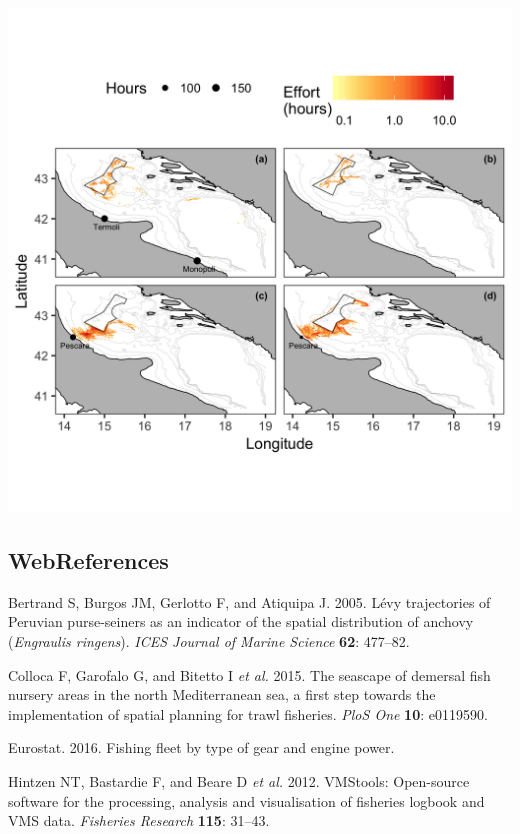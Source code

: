 \documentclass[11pt,]{article}
\begin{document}
\includegraphics[width=1.00000\textwidth]{../ms_1/ms_1_figs/map_incursions.png}

\newpage

\subsection*{WebReferences}\label{webreferences}

\hypertarget{refs}{}
\hypertarget{ref-bertrand2005levy}{}
Bertrand S, Burgos JM, Gerlotto F, and Atiquipa J. 2005. Lévy
trajectories of Peruvian purse-seiners as an indicator of the spatial
distribution of anchovy (\emph{Engraulis ringens}). \emph{ICES Journal
of Marine Science} \textbf{62}: 477--82.

\hypertarget{ref-colloca2015seascape}{}
Colloca F, Garofalo G, and Bitetto I \emph{et al.} 2015. The seascape of
demersal fish nursery areas in the north Mediterranean sea, a first step
towards the implementation of spatial planning for trawl fisheries.
\emph{PloS One} \textbf{10}: e0119590.

\hypertarget{ref-euro_stat2016}{}
Eurostat. 2016. Fishing fleet by type of gear and engine power.

\hypertarget{ref-hintzen2012vmstools}{}
Hintzen NT, Bastardie F, and Beare D \emph{et al.} 2012. VMStools:
Open-source software for the processing, analysis and visualisation of
fisheries logbook and VMS data. \emph{Fisheries Research} \textbf{115}:
31--43.
\end{document}
